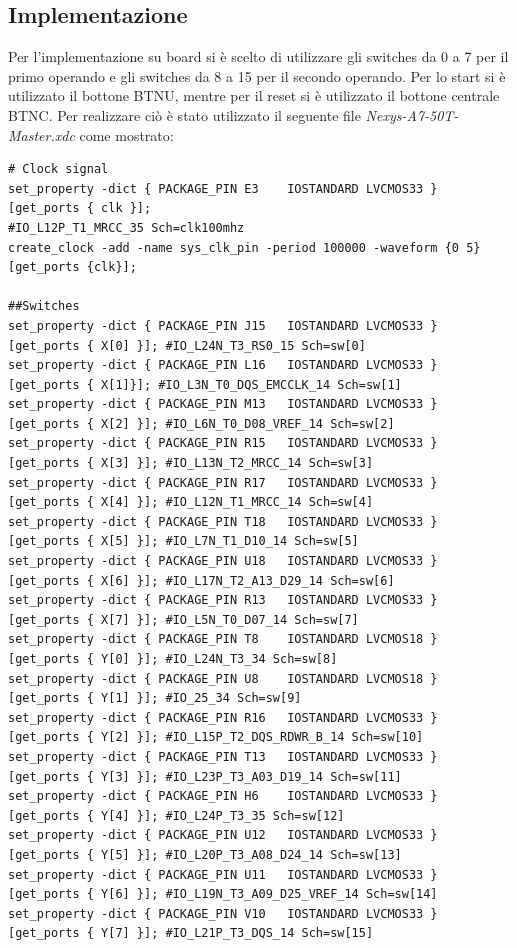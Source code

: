 \subsection{Implementazione}
Per l'implementazione su board si è scelto di utilizzare gli switches da 0 a 7 per il primo operando e gli switches da 8 a 15 per il secondo operando. Per lo start si è utilizzato il bottone BTNU, mentre per il reset si è utilizzato il bottone centrale BTNC. Per realizzare ciò è stato utilizzato il seguente file \textit{Nexys-A7-50T-Master.xdc} come mostrato:
{\footnotesize
\begin{verbatim}
# Clock signal
set_property -dict { PACKAGE_PIN E3    IOSTANDARD LVCMOS33 } [get_ports { clk }]; 
#IO_L12P_T1_MRCC_35 Sch=clk100mhz
create_clock -add -name sys_clk_pin -period 100000 -waveform {0 5}
[get_ports {clk}];

##Switches
set_property -dict { PACKAGE_PIN J15   IOSTANDARD LVCMOS33 } 
[get_ports { X[0] }]; #IO_L24N_T3_RS0_15 Sch=sw[0]
set_property -dict { PACKAGE_PIN L16   IOSTANDARD LVCMOS33 } 
[get_ports { X[1]}]; #IO_L3N_T0_DQS_EMCCLK_14 Sch=sw[1]
set_property -dict { PACKAGE_PIN M13   IOSTANDARD LVCMOS33 } 
[get_ports { X[2] }]; #IO_L6N_T0_D08_VREF_14 Sch=sw[2]
set_property -dict { PACKAGE_PIN R15   IOSTANDARD LVCMOS33 } 
[get_ports { X[3] }]; #IO_L13N_T2_MRCC_14 Sch=sw[3]
set_property -dict { PACKAGE_PIN R17   IOSTANDARD LVCMOS33 } 
[get_ports { X[4] }]; #IO_L12N_T1_MRCC_14 Sch=sw[4]
set_property -dict { PACKAGE_PIN T18   IOSTANDARD LVCMOS33 } 
[get_ports { X[5] }]; #IO_L7N_T1_D10_14 Sch=sw[5]
set_property -dict { PACKAGE_PIN U18   IOSTANDARD LVCMOS33 } 
[get_ports { X[6] }]; #IO_L17N_T2_A13_D29_14 Sch=sw[6]
set_property -dict { PACKAGE_PIN R13   IOSTANDARD LVCMOS33 } 
[get_ports { X[7] }]; #IO_L5N_T0_D07_14 Sch=sw[7]
set_property -dict { PACKAGE_PIN T8    IOSTANDARD LVCMOS18 } 
[get_ports { Y[0] }]; #IO_L24N_T3_34 Sch=sw[8]
set_property -dict { PACKAGE_PIN U8    IOSTANDARD LVCMOS18 } 
[get_ports { Y[1] }]; #IO_25_34 Sch=sw[9]
set_property -dict { PACKAGE_PIN R16   IOSTANDARD LVCMOS33 } 
[get_ports { Y[2] }]; #IO_L15P_T2_DQS_RDWR_B_14 Sch=sw[10]
set_property -dict { PACKAGE_PIN T13   IOSTANDARD LVCMOS33 } 
[get_ports { Y[3] }]; #IO_L23P_T3_A03_D19_14 Sch=sw[11]
set_property -dict { PACKAGE_PIN H6    IOSTANDARD LVCMOS33 } 
[get_ports { Y[4] }]; #IO_L24P_T3_35 Sch=sw[12]
set_property -dict { PACKAGE_PIN U12   IOSTANDARD LVCMOS33 } 
[get_ports { Y[5] }]; #IO_L20P_T3_A08_D24_14 Sch=sw[13]
set_property -dict { PACKAGE_PIN U11   IOSTANDARD LVCMOS33 } 
[get_ports { Y[6] }]; #IO_L19N_T3_A09_D25_VREF_14 Sch=sw[14]
set_property -dict { PACKAGE_PIN V10   IOSTANDARD LVCMOS33 } 
[get_ports { Y[7] }]; #IO_L21P_T3_DQS_14 Sch=sw[15]


\end{verbatim}}
